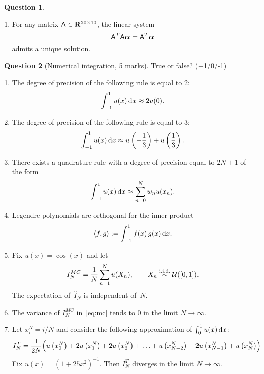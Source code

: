 \documentclass[11pt]{article}
\theoremstyle{definition}
\newtheorem{question}{{\normalfont \faGears}~Question}
\begin{document}
\begin{question}
\begin{enumerate}
        \item
            For any matrix $\mathsf A \in \mathbf R^{20 \times 10}$,
            the linear system
            \[
                \mathsf A^T \mathsf A \mathbf{\boldsymbol{\alpha}} = \mathsf A^T \mathbf{\boldsymbol{\alpha}}
            \]
            admits a unique solution.
    \end{enumerate}
\end{question}

\newpage
\begin{question}
    [Numerical integration, 5 marks]
    True or false? (+1/0/-1)
    \begin{enumerate}
        \item
            The degree of precision of the following rule is equal to 2:
            \[
                \int_{-1}^{1} u(x) \, \mathrm d x \approx 2u(0).
            \]

        \item
            The degree of precision of the following rule is equal to 3:
            \[
                \int_{-1}^{1} u(x) \, \mathrm d x \approx u \left(-\frac{1}{3}\right) + u \left(\frac{1}{3}\right).
            \]

        \item
            There exists a quadrature rule with a degree of precision equal to $2N + 1$ of the form
            \[
                \int_{-1}^{1} u(x) \, \mathrm d x \approx
                \sum_{n=0}^{N} w_n u(x_n).
            \]

        \item
            Legendre polynomials are orthogonal for the inner product
            \[
                \langle f, g\rangle := \int_{-1}^{1} f(x) \, g(x) \,  \mathrm d x.
            \]

        \item
            Fix $u(x) = \cos(x)$ and let
            \begin{equation}
                \label{eq:mc}
                I^{MC}_N = \frac{1}{N} \sum_{n=1}^{N} u(X_n), \qquad X_n \stackrel{\rm i.i.d.}{\sim} \mathcal U([0, 1]).
            \end{equation}
            The expectation of~$\widehat I_N$ is independent of~$N$.

        \item
            The variance of $I^{MC}_N$ in~\eqref{eq:mc} tends to 0 in the limit $N \to \infty$.

        \item
            Let $x^N_i = i/N$ and consider the following approximation of $\int_{0}^{1} u(x) \, \mathrm d x$:
            \begin{equation}
                \label{eq:trapezium}
                I^T_N = \frac{1}{2N} \Bigl( u\left(x^N_0\right) + 2 u\left(x^N_1\right) + 2 u\left(x^N_2\right) + \dotsc + u\left(x^N_{N-2}\right) + 2 u\left(x^N_{N-1}\right) + u\left(x^N_N\right) \Bigr)
            \end{equation}
            Fix $u(x) = (1 + 25 x^2)^{-1}$.
            Then $I^T_N$ diverges in the limit $N \to \infty$.


\end{enumerate}
\end{question}
\end{document}
